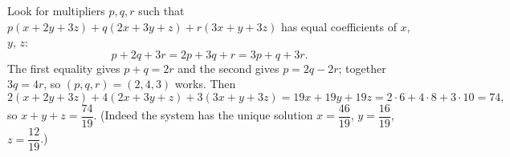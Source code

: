 Look for multipliers $p,q,r$ such that $p(x+2y+3z)+q(2x+3y+z)+r(3x+y+3z)$ has equal coefficients of $x$, $y$, $z$:
\[
p+2q+3r=2p+3q+r=3p+q+3r .
\]
The first equality gives $p+q=2r$ and the second gives $p=2q-2r$; together $3q=4r$, so $(p,q,r)=(2,4,3)$ works. Then
\[
2(x+2y+3z)+4(2x+3y+z)+3(3x+y+3z)=19x+19y+19z=2\cdot6+4\cdot8+3\cdot10=74,
\]
so $x+y+z=\boxed{\dfrac{74}{19}}$. (Indeed the system has the unique solution $x=\dfrac{46}{19}$, $y=\dfrac{16}{19}$, $z=\dfrac{12}{19}$.)
